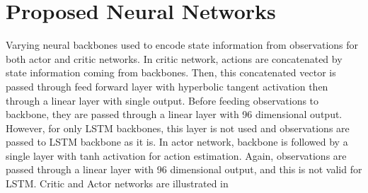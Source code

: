 \section{Proposed Neural Networks}
\label{sec:proposed_networks}

Varying neural backbones used to encode state information from observations for both actor and critic networks. 
In critic network, actions are concatenated by state information coming from backbones. 
Then, this concatenated vector is passed through feed forward layer with hyperbolic tangent activation then through a linear layer with single output. 
Before feeding observations to backbone, they are passed through a linear layer with 96 dimensional output. 
However, for only LSTM backbones, this layer is not used and observations are passed to LSTM backbone as it is. 
In actor network, backbone is followed by a single layer with tanh activation for action estimation. 
Again, observations are passed through a linear layer with 96 dimensional output, and this is not valid for LSTM.
Critic and Actor networks are illustrated in  


